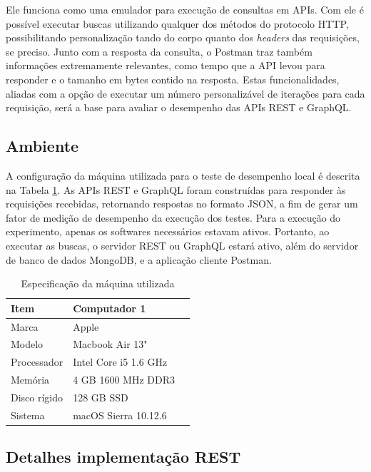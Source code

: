 Ele funciona como uma emulador para execução de consultas em APIs. Com ele é possível executar buscas utilizando qualquer dos métodos do protocolo HTTP, possibilitando personalização tando do corpo quanto dos \textit{headers} das requisições, se preciso. Junto com a resposta da consulta, o Postman traz também informações extremamente relevantes, como tempo que a API levou para responder e o tamanho em bytes contido na resposta. Estas funcionalidades, aliadas com a opção de executar um número personalizável de iterações para cada requisição, será a base para avaliar o desempenho das APIs REST e GraphQL.

\subsection{Ambiente}

A configuração da máquina utilizada para o teste de desempenho local é descrita na Tabela \ref{tab:computers}. As APIs REST e GraphQL foram construídas para responder às requisições recebidas, retornando respostas no formato JSON, a fim de gerar um fator de medição de desempenho da execução dos testes. Para a execução do experimento, apenas os softwares necessários estavam ativos. Portanto, ao executar as buscas, o servidor REST ou GraphQL estará ativo, além do servidor de banco de dados MongoDB, e a aplicação cliente Postman.

\begin{table}[htbp]
    \centering
    \begin{tabular}{| l | l | l |}
        \hline
        \textbf{Item} & \textbf{Computador 1} \\ \hline
        Marca         & Apple                 \\ \hline
        Modelo        & Macbook Air 13"       \\ \hline
        Processador   & Intel Core i5 1.6 GHz \\ \hline
        Memória       & 4 GB 1600 MHz DDR3    \\ \hline
        Disco rígido  & 128 GB SSD            \\ \hline
        Sistema       & macOS Sierra 10.12.6  \\ \hline
    \end{tabular}
    \caption{Especificação da máquina utilizada} \label{tab:computers}
\end{table}

\subsection{Detalhes implementação REST}

